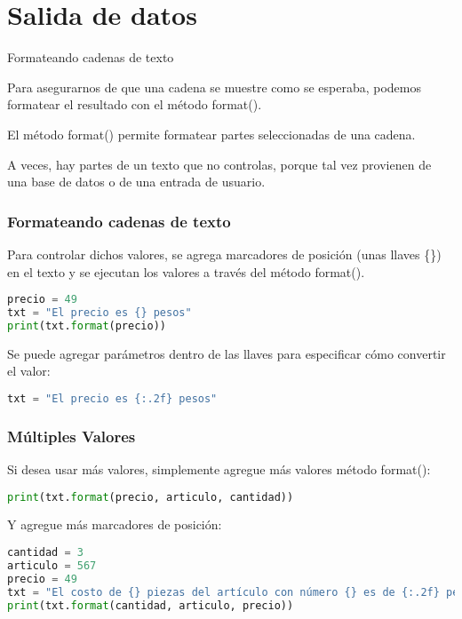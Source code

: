 \section{Salida de datos}

\begin{frame}[c]{Formateando cadenas de texto}

  Para asegurarnos de que una cadena se muestre como se esperaba,
  podemos formatear el resultado con el método
  \textcolor{codeKeyword}{format}().

  \vspace{\baselineskip}
  El método \textcolor{codeKeyword}{format}() permite formatear
  partes seleccionadas de una cadena.

  \vspace{\baselineskip}
  A veces, hay partes de un texto que no controlas, porque tal vez provienen
  de una base de datos o de una entrada de usuario.

\end{frame}

\begin{frame}[fragile]
  \frametitle{Formateando cadenas de texto}

  Para controlar dichos valores, se agrega marcadores de posición
  (unas llaves \{\}) en el texto y se ejecutan los valores a través del
  método \textcolor{codeKeyword}{format}().

  \vspace{\baselineskip}
  \begin{lstlisting}[language=Python]
precio = 49
txt = "El precio es {} pesos"
print(txt.format(precio))
  \end{lstlisting}

  \pausa
  Se puede agregar parámetros dentro de las llaves para especificar cómo convertir el valor:

  \vspace{\baselineskip}
  \begin{lstlisting}[language=Python]
txt = "El precio es {:.2f} pesos"
  \end{lstlisting}
\end{frame}

\begin{frame}[fragile]
  \frametitle{Múltiples Valores}

  Si desea usar más valores, simplemente agregue más valores
  método \textcolor{codeKeyword}{format}():

  \vspace{\baselineskip}
  \begin{lstlisting}[language=Python]
print(txt.format(precio, articulo, cantidad))
  \end{lstlisting}

  \pausa
  Y agregue más marcadores de posición: 

  \vspace{\baselineskip}
  \begin{lstlisting}[language=Python]
cantidad = 3
articulo = 567
precio = 49
txt = "El costo de {} piezas del artículo con número {} es de {:.2f} pesos"
print(txt.format(cantidad, articulo, precio))
  \end{lstlisting}
\end{frame}

